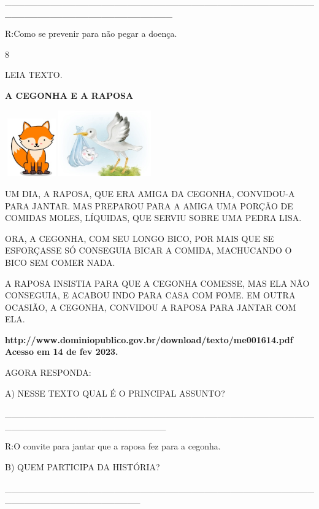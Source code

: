 {{\_\_\_\_\_\_\_\_\_\_\_\_\_\_\_\_\_\_\_\_\_\_\_\_\_\_\_\_\_\_\_\_\_\_\_\_\_\_\_\_\_\_\_\_\_\_\_\_\_\_\_\_\_\_\_\_\_\_\_\_\_\_\_\_\_\_\_\_\_\_\_\_\_\_

R:Como se prevenir para não pegar a doença.

\num{8}

LEIA TEXTO.

\textbf{A CEGONHA E A RAPOSA}

\includegraphics[width=0.90625in,height=0.98597in]{media/image121.jpeg}\includegraphics[width=1.57292in,height=1.12292in]{media/image122.jpeg}

UM DIA, A RAPOSA, QUE ERA AMIGA DA CEGONHA, CONVIDOU-A PARA JANTAR. MAS
PREPAROU PARA A AMIGA UMA PORÇÃO DE COMIDAS MOLES, LÍQUIDAS, QUE SERVIU
SOBRE UMA PEDRA LISA.

ORA, A CEGONHA, COM SEU LONGO BICO, POR MAIS QUE SE ESFORÇASSE SÓ
CONSEGUIA BICAR A COMIDA, MACHUCANDO O BICO SEM COMER NADA.

A RAPOSA INSISTIA PARA QUE A CEGONHA COMESSE, MAS ELA NÃO CONSEGUIA, E
ACABOU INDO PARA CASA COM FOME. EM OUTRA OCASIÃO, A CEGONHA, CONVIDOU A
RAPOSA PARA JANTAR COM ELA.

\textbf{http://www.dominiopublico.gov.br/download/texto/me001614.pdf
Acesso em 14 de fev 2023.}

AGORA RESPONDA:

A) NESSE TEXTO QUAL É O PRINCIPAL ASSUNTO?

\_\_\_\_\_\_\_\_\_\_\_\_\_\_\_\_\_\_\_\_\_\_\_\_\_\_\_\_\_\_\_\_\_\_\_\_\_\_\_\_\_\_\_\_\_\_\_\_\_\_\_\_\_\_\_\_\_\_\_\_\_\_\_\_\_\_\_\_\_\_\_\_\_

R:O convite para jantar que a raposa fez para a cegonha.

B) QUEM PARTICIPA DA HISTÓRIA?

\_\_\_\_\_\_\_\_\_\_\_\_\_\_\_\_\_\_\_\_\_\_\_\_\_\_\_\_\_\_\_\_\_\_\_\_\_\_\_\_\_\_\_\_\_\_\_\_\_\_\_\_\_\_\_\_\_\_\_\_\_\_\_\_\_\_\_\_\_

}}
